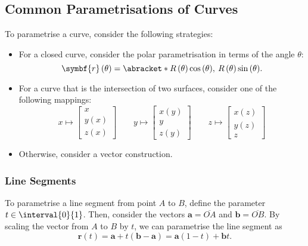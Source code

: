 \documentclass{article}
\begin{document}
\subsection{Common Parametrisations of Curves}
To parametrise a curve, consider the following strategies:
\begin{itemize}
    \item For a closed curve, consider the polar parametrisation in
          terms of the angle \(\theta\):
          \begin{equation*}
              \symbf{r}\left( \theta \right) = \abracket*{R\left( \theta \right) \cos{\left( \theta \right)},\: R\left( \theta \right) \sin{\left( \theta \right)}}.
          \end{equation*}
    \item For a curve that is the intersection of two surfaces,
          consider one of the following mappings:
          \begin{equation*}
              x \mapsto
              \begin{bmatrix}
                  x                 \\
                  y\left( x \right) \\
                  z\left( x \right)
              \end{bmatrix}
              \qquad
              y \mapsto
              \begin{bmatrix}
                  x\left( y \right) \\
                  y                 \\
                  z\left( y \right)
              \end{bmatrix}
              \qquad
              z \mapsto
              \begin{bmatrix}
                  x\left( z \right) \\
                  y\left( z \right) \\
                  z
              \end{bmatrix}
          \end{equation*}
    \item Otherwise, consider a vector construction.
\end{itemize}
\subsubsection{Line Segments}
To parametrise a line segment from point \(A\) to \(B\), define the
parameter \(t \in \interval{0}{1}\). Then, consider the vectors
\(\symbf{a} = \overline{OA}\) and \(\symbf{b} = \overline{OB}\). By
scaling the vector from \(A\) to \(B\) by \(t\), we can parametrise the
line segment as
\begin{equation*}
    \symbf{r}\left( t \right) = \symbf{a} + t \left( \symbf{b} - \symbf{a} \right) = \symbf{a} \left( 1 - t \right) + \symbf{b} t.
\end{equation*}
\end{document}
